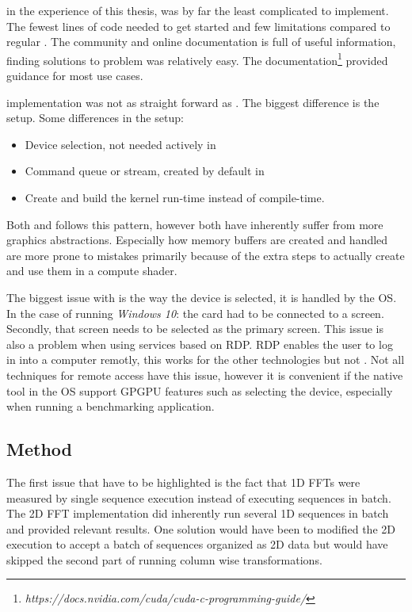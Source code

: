 {\CU} in the experience of this thesis, {\CU} was by far the least complicated to implement. The fewest lines of code needed to get started and few limitations compared to regular {\CPP}. The {\CU} community and online documentation is full of useful information, finding solutions to problem was relatively easy. The documentation\footnote{\textit{https://docs.nvidia.com/cuda/cuda-c-programming-guide/}} provided guidance for most use cases.

{\OCL} implementation was not as straight forward as {\CU}. The biggest difference is the setup. Some differences in the setup:
\begin{itemize}
	\item Device selection, not needed actively in {\CU}
	\item Command queue or stream, created by default in {\CU}
	\item Create and build the \gls{kernel} run-time instead of compile-time.
\end{itemize}
Both {\DX} and {\GL} follows this pattern, however both have inherently suffer from more graphics abstractions. Especially how memory buffers are created and handled are more prone to mistakes primarily because of the extra steps to actually create and use them in a compute shader.

The biggest issue with {\GL} is the way the device is selected, it is handled by the \gls{OS}. In the case of running \emph{Windows 10}: the card had to be connected to a screen. Secondly, that screen needs to be selected as the primary screen. This issue is also a problem when using services based on \gls{RDP}. \gls{RDP} enables the user to log in into a computer remotly, this works for the other technologies but not {\GL}. Not all techniques for remote access have this issue, however it is convenient if the native tool in the \gls{OS} support \gls{GPGPU} features such as selecting the device, especially when running a benchmarking application.

\subsection{Method}

The first issue that have to be highlighted is the fact that \gls{1D} \gls{FFT}s were measured by single sequence execution instead of executing sequences in batch. The \gls{2D} \gls{FFT} implementation did inherently run several \gls{1D} sequences in batch and provided relevant results. One solution would have been to modified the \gls{2D} execution to accept a batch of sequences organized as \gls{2D} data but would have skipped the second part of running column wise transformations.

